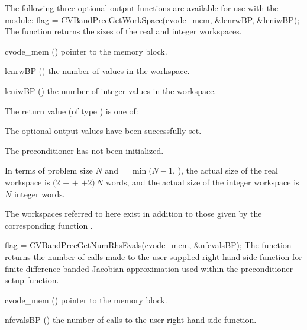 \noindent The following three optional output functions are available for use with 
the {\cvbandpre} module:
{
  flag = CVBandPrecGetWorkSpace(cvode\_mem, \&lenrwBP, \&leniwBP);
}
{
  The function  returns the sizes of
  the {\cvbandpre} real and integer workspaces.
}
{
  \begin{args}
  \item[cvode\_mem] ()
    pointer to the {\cvode} memory block.
  \item[lenrwBP] ()
    the number of  values in the {\cvbandpre} workspace.
  \item[leniwBP] ()
    the number of integer values in the {\cvbandpre} workspace.
  \end{args}
}
{
  The return value  (of type ) is one of:
  \begin{args}
  \item[\Id{CVSPILS\_SUCCESS}] 
    The optional output values have been successfully set.
  \item[\Id{CVSPILS\_PMEM\_NULL}]
    The {\cvbandpre} preconditioner has not been initialized.
  \end{args}
}
{
  In terms of problem size $N$ and  = $\min(N-1,\,$),
  the actual size of the real workspace is
  $(2$  $+$  $+$  $+2)\, N$  words,
  and the actual size of the integer workspace is $N$ integer words.

  The workspaces referred to here exist in addition to those given by the
  corresponding function .
}
{
  flag = CVBandPrecGetNumRhsEvals(cvode\_mem, \&nfevalsBP);
}
{
  The function  returns the
  number of calls made to the user-supplied right-hand side function for
  finite difference banded Jacobian approximation used within
  the preconditioner setup function.
}
{
  \begin{args}[nfevalsBP]
  \item[cvode\_mem] ()
    pointer to the {\cvode} memory block.
  \item[nfevalsBP] ()
    the number of calls to the user right-hand side function.
  \end{args}
}
